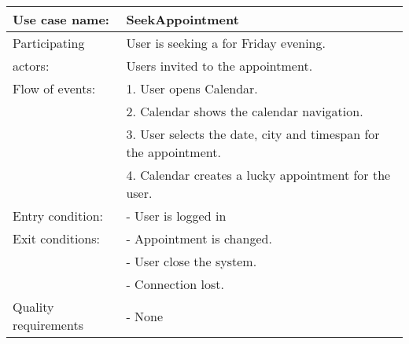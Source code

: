 {\tabulinesep=1.2mm
\begin{tabu}{ | p{3cm} | p{13cm} |}
    \hline
    Use case name: 			& 		SeekAppointment\\ \hline
    Participating  			& 		User is seeking a for Friday evening. \\
    actors:					&		Users invited to the appointment.\\ \hline
    Flow of events: 		& 		1. User opens Calendar. \\
							&		2. Calendar shows the calendar navigation.\\
							&		3. User selects the date, city and timespan for the appointment.\\
							&		4. Calendar creates a lucky appointment for the user.\\\hline
    Entry condition: 		& 		- User is logged in  \\ \hline
	Exit conditions: 		&		- Appointment is changed.\\
							&		- User close the system.\\
							&		- Connection lost.\\\hline
	Quality requirements	&	 	- None \\\hline
\end{tabu}
}